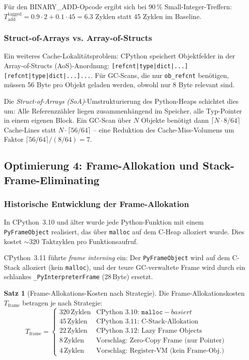 ﻿\documentclass[a4paper,12pt]{scrreprt}
\theoremstyle{definition}
\newtheorem{satz}{Satz}[section]
\begin{document}
	Für den BINARY\_ADD-Opcode ergibt sich bei 90\,\% Small-Integer-Treffern:
	$T_{\mathrm{add}}^{\mathrm{tagged}} = 0.9 \cdot 2 + 0.1 \cdot 45 = 6.3$
	Zyklen statt 45 Zyklen im Baseline.
	
	\subsubsection{Struct-of-Arrays vs. Array-of-Structs}
	
	Ein weiteres Cache-Lokalitätsproblem: CPython speichert Objektfelder
	in der Array-of-Structs (AoS)-Anordnung:\newline
	\texttt{[refcnt|type|dict|...][refcnt|type|dict|...]...}. Für
	GC-Scans, die nur \texttt{ob\_refcnt} benötigen, müssen 56 Byte
	pro Objekt geladen werden, obwohl nur 8 Byte relevant sind.
	
	Die \emph{Struct-of-Arrays (SoA)}-Umstrukturierung des Python-Heaps
	schichtet dies um: Alle Referenzzähler liegen zusammenhängend im
	Speicher, alle Typ-Pointer in einem eigenen Block. Ein GC-Scan über
	$N$ Objekte benötigt dann $\lceil N \cdot 8 / 64 \rceil$ Cache-Lines
	statt $N \cdot \lceil 56/64 \rceil$ -- eine Reduktion des
	Cache-Miss-Volumens um Faktor $\lceil 56/64 \rceil / (8/64) = 7$.
	
	\subsection{Optimierung 4: Frame-Allokation und Stack-Frame-Eliminating}
	
	\subsubsection{Historische Entwicklung der Frame-Allokation}
	
	In CPython~3.10 und älter wurde jede Python-Funktion mit einem
	\texttt{PyFrameObject} realisiert, das über \texttt{malloc} auf dem
	C-Heap alloziert wurde. Dies kostet $\sim 320$ Taktzyklen pro
	Funktionsaufruf.
	
	CPython~3.11 führte \emph{frame interning} ein: Der \texttt{PyFrameObject}
	wird auf dem C-Stack alloziert (kein \texttt{malloc}), und der
	teure GC-verwaltete Frame wird durch ein schlankes
	\texttt{\_PyInterpreterFrame} (28\,Byte) ersetzt.
	
	\begin{satz}[Frame-Allokations-Kosten nach Strategie]
		\label{satz:frame_cost}
		Die Frame-Allokationskosten $T_{\mathrm{frame}}$ betragen je nach Strategie:
		\[
		T_{\mathrm{frame}} = \begin{cases}
			320\,\mathrm{Zyklen} & \text{CPython~3.10: } \texttt{malloc}-basiert \\
			45\,\mathrm{Zyklen}  & \text{CPython~3.11: C-Stack-Allokation} \\
			22\,\mathrm{Zyklen}  & \text{CPython~3.12: Lazy Frame Objects} \\
			8\,\mathrm{Zyklen}  & \text{Vorschlag: Zero-Copy Frame (nur Pointer)} \\
			4\,\mathrm{Zyklen}  & \text{Vorschlag: Register-VM (kein Frame-Obj.)}
		\end{cases}
		\]
	\end{satz}
	
\end{document}

